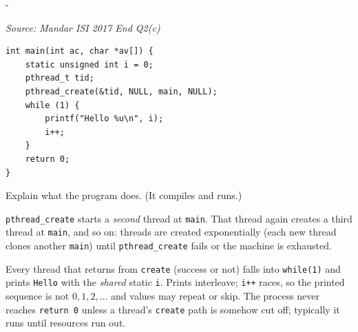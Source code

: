 \documentclass[11pt,a4paper]{article}
\makeatletter
\newcommand{\keepspace}[1]{\par\penalty-100\begingroup
  \setlength{\dimen@}{#1}\dimen@ii\pagegoal\advance\dimen@ii-\pagetotal
  \ifdim\dimen@>\dimen@ii\ifdim\dimen@ii>\z@\vfil\fi\break\fi\endgroup}
\newcounter{qn}[section]
\newenvironment{Qn}[4]{%
  \refstepcounter{qn}\keepspace{7\baselineskip}%
  \begin{tcolorbox}[qboxstyle, title={Q\thesection.\theqn\ \ [#1 \textbar\ #2]\ \ #4}]%
  {\footnotesize\color{g3}\textit{Source: #3}}\par\smallskip%
}{%
  \end{tcolorbox}%
}
\newenvironment{Sol}{%
  \begin{tcolorbox}[sboxstyle, title={Solution}]%
}{%
  \end{tcolorbox}\vspace{0.35em}%
}
\makeatother
\begin{document}
\begin{Qn}{Medium-Hard}{Lect 16}{Mandar ISI 2017 End Q2(c)}{\texttt{pthread\_create(\&tid, NULL, main, NULL)} plus an infinite print}
\begin{lstlisting}[numbers=none]
int main(int ac, char *av[]) {
    static unsigned int i = 0;
    pthread_t tid;
    pthread_create(&tid, NULL, main, NULL);
    while (1) {
        printf("Hello %u\n", i);
        i++;
    }
    return 0;
}
\end{lstlisting}

Explain what the program does. (It compiles and runs.)
\end{Qn}
\begin{Sol}
\texttt{pthread\_create} starts a \emph{second} thread at \texttt{main}. That thread again creates a third thread at \texttt{main}, and so on: threads are created exponentially (each new thread clones another \texttt{main}) until \texttt{pthread\_create} fails or the machine is exhausted.

Every thread that returns from \texttt{create} (success or not) falls into \texttt{while(1)} and prints \texttt{Hello} with the \emph{shared} static \texttt{i}. Prints interleave; \texttt{i++} races, so the printed sequence is not $0,1,2,\ldots$ and values may repeat or skip. The process never reaches \texttt{return 0} unless a thread's \texttt{create} path is somehow cut off; typically it runs until resources run out.
\end{Sol}
\end{document}
